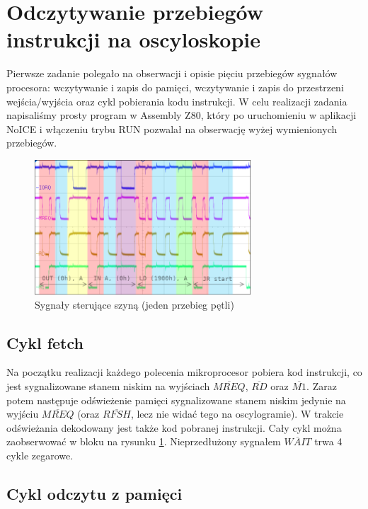 \documentclass[fleqn]{article}
\newcommand\square[1]{
	\fcolorbox{black}{#1}{\rule{0pt}{6pt}\rule{6pt}{0pt}}
}
\begin{document}
\section{Odczytywanie przebiegów instrukcji na oscyloskopie}

Pierwsze zadanie polegało na obserwacji i opisie pięciu przebiegów sygnałów procesora: wczytywanie i zapis do pamięci, wczytywanie i zapis do przestrzeni wejścia/wyjścia oraz cykl pobierania kodu instrukcji.
W celu realizacji zadania napisaliśmy prosty program w Assembly Z80, który po uruchomieniu w aplikacji NoICE i włączeniu trybu RUN pozwalał na obserwację wyżej wymienionych przebiegów.



\begin{figure}[H]
	\centering
	\includegraphics[width=0.72\textwidth]{img/1a.png}
	\caption{Sygnały sterujące szyną (jeden przebieg pętli)}
	\label{fig:1a}
\end{figure}

\subsection{Cykl fetch}

Na początku realizacji każdego polecenia mikroprocesor pobiera kod instrukcji, co jest sygnalizowane stanem niskim na wyjściach $\overline{MREQ}$, $\overline{RD}$ oraz $\overline{M1}$. Zaraz potem następuje odświeżenie pamięci sygnalizowane stanem niskim jedynie na wyjściu $\overline{MREQ}$ (oraz $\overline{RFSH}$, lecz nie widać tego na oscylogramie). W trakcie odświeżania dekodowany jest także kod pobranej instrukcji.
Cały cykl można zaobserwować w bloku \square{red} na rysunku \ref{fig:1a}. Nieprzedłużony sygnałem $\overline{WAIT}$ trwa 4 cykle zegarowe.

\subsection{Cykl odczytu z pamięci}
\end{document}
